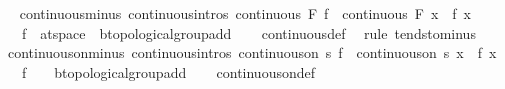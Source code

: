 \begin{isabellebody}
\isadelimproof
\ %
\endisadelimproof
%
\isatagproof
\isacommand{{\isachardot}{\kern0pt}{\isachardot}{\kern0pt}}\isamarkupfalse%
%
\endisatagproof
{\isafoldproof}%
%
\isadelimproof
%
\endisadelimproof
\isanewline
\isanewline
{}\isamarkupfalse%
\ continuous{\isacharunderscore}{\kern0pt}minus\ {\isacharbrackleft}{\kern0pt}continuous{\isacharunderscore}{\kern0pt}intros{\isacharbrackright}{\kern0pt}{\isacharcolon}{\kern0pt}\ {\isachardoublequoteopen}continuous\ F\ f\ {\isasymLongrightarrow}\ continuous\ F\ {\isacharparenleft}{\kern0pt}{\isasymlambda}x{\isachardot}{\kern0pt}\ {\isacharminus}{\kern0pt}\ f\ x{\isacharparenright}{\kern0pt}{\isachardoublequoteclose}\isanewline
\ \ \ f\ {\isacharcolon}{\kern0pt}{\isacharcolon}{\kern0pt}\ {\isachardoublequoteopen}{\isacharprime}{\kern0pt}a{\isacharcolon}{\kern0pt}{\isacharcolon}{\kern0pt}t{}{\isacharunderscore}{\kern0pt}space\ {\isasymRightarrow}\ {\isacharprime}{\kern0pt}b{\isacharcolon}{\kern0pt}{\isacharcolon}{\kern0pt}topological{\isacharunderscore}{\kern0pt}group{\isacharunderscore}{\kern0pt}add{\isachardoublequoteclose}\isanewline
%
\isadelimproof
\ \ %
\endisadelimproof
%
\isatagproof
{}\isamarkupfalse%
\ continuous{\isacharunderscore}{\kern0pt}def\ \isamarkupfalse%
\ {\isacharparenleft}{\kern0pt}rule\ tendsto{\isacharunderscore}{\kern0pt}minus{\isacharparenright}{\kern0pt}%
\endisatagproof
{\isafoldproof}%
%
\isadelimproof
\isanewline
%
\endisadelimproof
\isanewline
{}\isamarkupfalse%
\ continuous{\isacharunderscore}{\kern0pt}on{\isacharunderscore}{\kern0pt}minus\ {\isacharbrackleft}{\kern0pt}continuous{\isacharunderscore}{\kern0pt}intros{\isacharbrackright}{\kern0pt}{\isacharcolon}{\kern0pt}\ {\isachardoublequoteopen}continuous{\isacharunderscore}{\kern0pt}on\ s\ f\ {\isasymLongrightarrow}\ continuous{\isacharunderscore}{\kern0pt}on\ s\ {\isacharparenleft}{\kern0pt}{\isasymlambda}x{\isachardot}{\kern0pt}\ {\isacharminus}{\kern0pt}\ f\ x{\isacharparenright}{\kern0pt}{\isachardoublequoteclose}\isanewline
\ \ \ f\ {\isacharcolon}{\kern0pt}{\isacharcolon}{\kern0pt}\ {\isachardoublequoteopen}{\isacharunderscore}{\kern0pt}\ {\isasymRightarrow}\ {\isacharprime}{\kern0pt}b{\isacharcolon}{\kern0pt}{\isacharcolon}{\kern0pt}topological{\isacharunderscore}{\kern0pt}group{\isacharunderscore}{\kern0pt}add{\isachardoublequoteclose}\isanewline
%
\isadelimproof
\ \ %
\endisadelimproof
%
\isatagproof
{}\isamarkupfalse%
\ continuous{\isacharunderscore}{\kern0pt}on{\isacharunderscore}{\kern0pt}def\ \isamarkupfalse%

\end{isabellebody}
